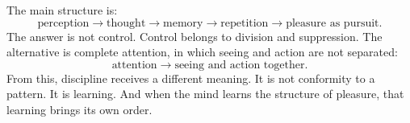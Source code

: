 The main structure is:
\begin{equation}
\text{perception}
\longrightarrow
\text{thought}
\longrightarrow
\text{memory}
\longrightarrow
\text{repetition}
\longrightarrow
\text{pleasure as pursuit}.
\end{equation}
The answer is not control. Control belongs to division and suppression. The alternative is complete attention, in which seeing and action are not separated:
\begin{equation}
\text{attention}
\longrightarrow
\text{seeing and action together}.
\end{equation}
From this, discipline receives a different meaning. It is not conformity to a pattern. It is learning. And when the mind learns the structure of pleasure, that learning brings its own order.